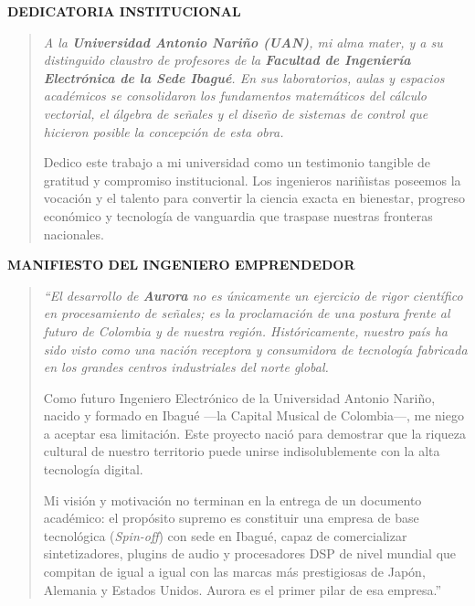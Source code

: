 \documentclass[11pt,a4paper]{article}
\begin{document}
\newpage
\thispagestyle{plain}
\vspace*{1.5cm}

\begin{center}
    {\Large \bfseries \textcolor{uanblue}{DEDICATORIA INSTITUCIONAL}}
\end{center}

\vspace{0.8cm}

\begin{quote}
\itshape
A la \textbf{Universidad Antonio Nariño (UAN)}, mi alma mater, y a su distinguido claustro de profesores de la \textbf{Facultad de Ingeniería Electrónica de la Sede Ibagué}. En sus laboratorios, aulas y espacios académicos se consolidaron los fundamentos matemáticos del cálculo vectorial, el álgebra de señales y el diseño de sistemas de control que hicieron posible la concepción de esta obra.

Dedico este trabajo a mi universidad como un testimonio tangible de gratitud y compromiso institucional. Los ingenieros nariñistas poseemos la vocación y el talento para convertir la ciencia exacta en bienestar, progreso económico y tecnología de vanguardia que traspase nuestras fronteras nacionales.
\end{quote}

\vspace{1.5cm}

\begin{center}
    {\Large \bfseries \textcolor{uanblue}{MANIFIESTO DEL INGENIERO EMPRENDEDOR}}
\end{center}

\vspace{0.8cm}

\begin{quote}
\itshape
``El desarrollo de \textbf{Aurora} no es únicamente un ejercicio de rigor científico en procesamiento de señales; es la proclamación de una postura frente al futuro de Colombia y de nuestra región. Históricamente, nuestro país ha sido visto como una nación receptora y consumidora de tecnología fabricada en los grandes centros industriales del norte global.

Como futuro Ingeniero Electrónico de la Universidad Antonio Nariño, nacido y formado en Ibagué —la Capital Musical de Colombia—, me niego a aceptar esa limitación. Este proyecto nació para demostrar que la riqueza cultural de nuestro territorio puede unirse indisolublemente con la alta tecnología digital. 

Mi visión y motivación no terminan en la entrega de un documento académico: el propósito supremo es constituir una empresa de base tecnológica (\textit{Spin-off}) con sede en Ibagué, capaz de comercializar sintetizadores, plugins de audio y procesadores DSP de nivel mundial que compitan de igual a igual con las marcas más prestigiosas de Japón, Alemania y Estados Unidos. Aurora es el primer pilar de esa empresa.''
\end{quote}
\end{document}

